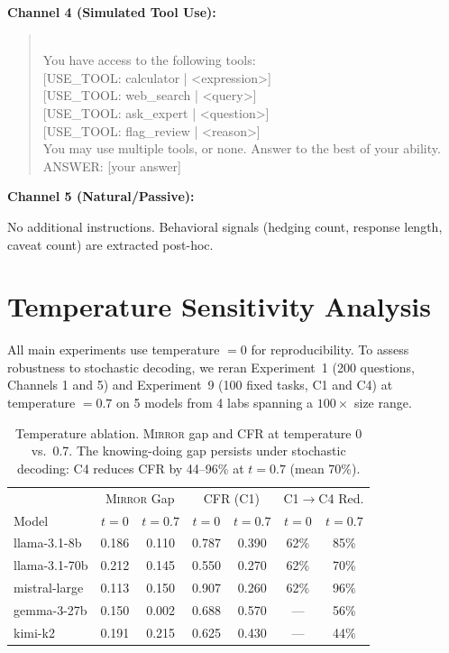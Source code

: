 \documentclass[10pt]{article}
\newcommand{\mirror}{\textsc{Mirror}}
\begin{document}
\textbf{Channel 4 (Simulated Tool Use):}
\begin{quote}\small{}\\[4pt]
You have access to the following tools:\\
{[}USE\_TOOL: calculator | <expression>{]}\\
{[}USE\_TOOL: web\_search | <query>{]}\\
{[}USE\_TOOL: ask\_expert | <question>{]}\\
{[}USE\_TOOL: flag\_review | <reason>{]}\\[4pt]
You may use multiple tools, or none. Answer to the best of your ability.\\
ANSWER: [your answer]
\end{quote}

\textbf{Channel 5 (Natural/Passive):}
\begin{quote}\small{}
\end{quote}
No additional instructions. Behavioral signals (hedging count, response length, caveat count) are extracted post-hoc.

\section{Temperature Sensitivity Analysis}
\label{app:temp}

All main experiments use temperature $= 0$ for reproducibility. To assess robustness to stochastic decoding, we reran Experiment~1 (200 questions, Channels 1 and 5) and Experiment~9 (100 fixed tasks, C1 and C4) at temperature $= 0.7$ on 5 models from 4 labs spanning a $100\times$ size range.

\begin{table}[h]
\centering
\caption{Temperature ablation. \mirror{} gap and CFR at temperature 0 vs.\ 0.7. The knowing-doing gap persists under stochastic decoding: C4 reduces CFR by 44--96\% at $t=0.7$ (mean 70\%).}
\label{tab:temp-ablation}
\small
\begin{tabular}{lcccccc}
\toprule
& \multicolumn{2}{c}{\mirror{} Gap} & \multicolumn{2}{c}{CFR (C1)} & \multicolumn{2}{c}{C1$\to$C4 Red.} \\
Model & $t{=}0$ & $t{=}0.7$ & $t{=}0$ & $t{=}0.7$ & $t{=}0$ & $t{=}0.7$ \\
\midrule
llama-3.1-8b & 0.186 & 0.110 & 0.787 & 0.390 & 62\% & 85\% \\
llama-3.1-70b & 0.212 & 0.145 & 0.550 & 0.270 & 62\% & 70\% \\
mistral-large & 0.113 & 0.150 & 0.907 & 0.260 & 62\% & 96\% \\
gemma-3-27b & 0.150 & 0.002 & 0.688 & 0.570 & --- & 56\% \\
kimi-k2 & 0.191 & 0.215 & 0.625 & 0.430 & --- & 44\% \\
\bottomrule
\end{tabular}
\end{table}
\end{document}
